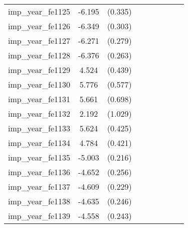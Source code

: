 {\begin{tabular}{l*{4}{cc}}
imp\_year\_fe1125&   -6.195\sym{***}&  (0.335)&                  &         &                  &         &                  &         \\
imp\_year\_fe1126&   -6.349\sym{***}&  (0.303)&                  &         &                  &         &                  &         \\
imp\_year\_fe1127&   -6.271\sym{***}&  (0.279)&                  &         &                  &         &                  &         \\
imp\_year\_fe1128&   -6.376\sym{***}&  (0.263)&                  &         &                  &         &                  &         \\
imp\_year\_fe1129&    4.524\sym{***}&  (0.439)&                  &         &                  &         &                  &         \\
imp\_year\_fe1130&    5.776\sym{***}&  (0.577)&                  &         &                  &         &                  &         \\
imp\_year\_fe1131&    5.661\sym{***}&  (0.698)&                  &         &                  &         &                  &         \\
imp\_year\_fe1132&    2.192\sym{*}  &  (1.029)&                  &         &                  &         &                  &         \\
imp\_year\_fe1133&    5.624\sym{***}&  (0.425)&                  &         &                  &         &                  &         \\
imp\_year\_fe1134&    4.784\sym{***}&  (0.421)&                  &         &                  &         &                  &         \\
imp\_year\_fe1135&   -5.003\sym{***}&  (0.216)&                  &         &                  &         &                  &         \\
imp\_year\_fe1136&   -4.652\sym{***}&  (0.256)&                  &         &                  &         &                  &         \\
imp\_year\_fe1137&   -4.609\sym{***}&  (0.229)&                  &         &                  &         &                  &         \\
imp\_year\_fe1138&   -4.635\sym{***}&  (0.246)&                  &         &                  &         &                  &         \\
imp\_year\_fe1139&   -4.558\sym{***}&  (0.243)&                  &         &                  &         &                  &         \\

\end{tabular}}
